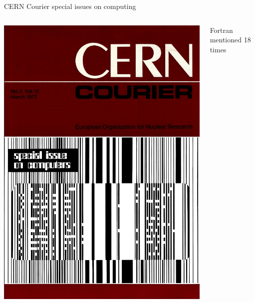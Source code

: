 \documentclass[aspectratio=169]{beamer}
\begin{document}
\begin{frame}{CERN Courier special issues on computing}
\begin{columns}
\begin{center}
\vspace{0.2 cm}
\includegraphics[width=\linewidth]{PLOTS/cern-courier-2.png}

\vspace{0.5 cm}
\end{center}

Fortran mentioned 18 times
\end{columns}


\end{frame}
\end{document}
